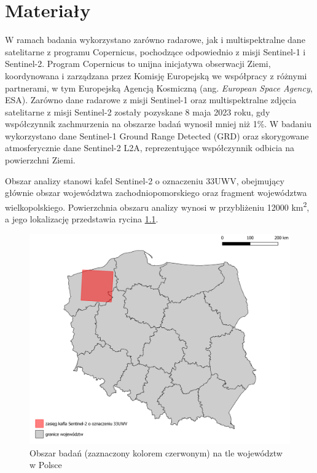 \documentclass{amuthesis}
\begin{document}

\hypertarget{sec-materialy}{%
\chapter{Materiały}\label{sec-materialy}}

W ramach badania wykorzystano zarówno radarowe, jak i multispektralne
dane satelitarne z programu Copernicus, pochodzące odpowiednio z misji
Sentinel-1 i Sentinel-2. Program Copernicus to unijna inicjatywa
obserwacji Ziemi, koordynowana i zarządzana przez Komisję Europejską we
współpracy z różnymi partnerami, w tym Europejską Agencją Kosmiczną
(ang. \emph{European Space Agency}, ESA). Zarówno dane radarowe z misji
Sentinel-1 oraz multispektralne zdjęcia satelitarne z misji Sentinel-2
zostały pozyskane 8 maja 2023 roku, gdy współczynnik zachmurzenia na
obszarze badań wynosił mniej niż 1\%. W badaniu wykorzystano dane
Sentinel-1 Ground Range Detected (GRD) oraz skorygowane atmosferycznie
dane Sentinel-2 L2A, reprezentujące współczynnik odbicia na powierzchni
Ziemi.

Obszar analizy stanowi kafel Sentinel-2 o oznaczeniu 33UWV, obejmujący
głównie obszar województwa zachodniopomorskiego oraz fragment
województwa wielkopolskiego. Powierzchnia obszaru analizy wynosi w
przybliżeniu 12000 km\textsuperscript{2}, a jego lokalizację przedstawia
rycina \ref{fig-rycina-area}.

\begin{figure}[t]

{\centering \includegraphics[width=1\textwidth,height=\textheight]{figures/sen2_extent.png}

}

\caption{\label{fig-rycina-area}Obszar badań (zaznaczony kolorem
czerwonym) na tle województw w Polsce}

\end{figure}
\end{document}
